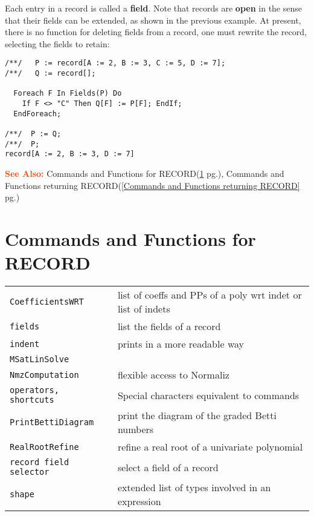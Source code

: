 \documentclass[a4paper]{mybook}
\newcommand\SeeAlso{\par\textcolor{OrangeRed}{\textbf{\large See Also: }}}
\begin{document}
Each entry in a record is called a \textbf{field}.  Note that records are
\textbf{open} in the sense that their fields can be extended, as shown in
the previous example.  At present, there is no function for deleting
fields from a record, one must rewrite the record, selecting the
fields to retain:
\begin{Verbatim}[label=example, rulecolor=\color{PineGreen}, frame=single]
/**/   P := record[A := 2, B := 3, C := 5, D := 7];
/**/   Q := record[];

  Foreach F In Fields(P) Do
    If F <> "C" Then Q[F] := P[F]; EndIf;
  EndForeach;

/**/  P := Q;
/**/  P;
record[A := 2, B := 3, D := 7]
\end{Verbatim}


\SeeAlso %
  Commands and Functions for RECORD(\ref{Commands and Functions for RECORD} pg.\pageref{Commands and Functions for RECORD}), 
    Commands and Functions returning RECORD(\ref{Commands and Functions returning RECORD} pg.\pageref{Commands and Functions returning RECORD})

\section{Commands and Functions for RECORD}
\label{Commands and Functions for RECORD}

        

\begin{center}
\begin{longtable}{ll}
   
{\verb~CoefficientsWRT~} &
      list of coeffs and PPs of a poly wrt indet or list of indets\\
   
{\verb~fields~} &
      list the fields of a record\\
   
{\verb~indent~} &
      prints in a more readable way\\
   
{\verb~MSatLinSolve~} &
      \\
   
{\verb~NmzComputation~} &
      flexible access to Normaliz\\
   
{\verb~operators, shortcuts~} &
      Special characters equivalent to commands\\
   
{\verb~PrintBettiDiagram~} &
      print the diagram of the graded Betti numbers\\
   
{\verb~RealRootRefine~} &
      refine a real root of a univariate polynomial\\
   
{\verb~record field selector~} &
      select a field of a record\\
   
{\verb~shape~} &
      extended list of types involved in an expression\\
   
\end{longtable}
\end{center}
\end{document}
